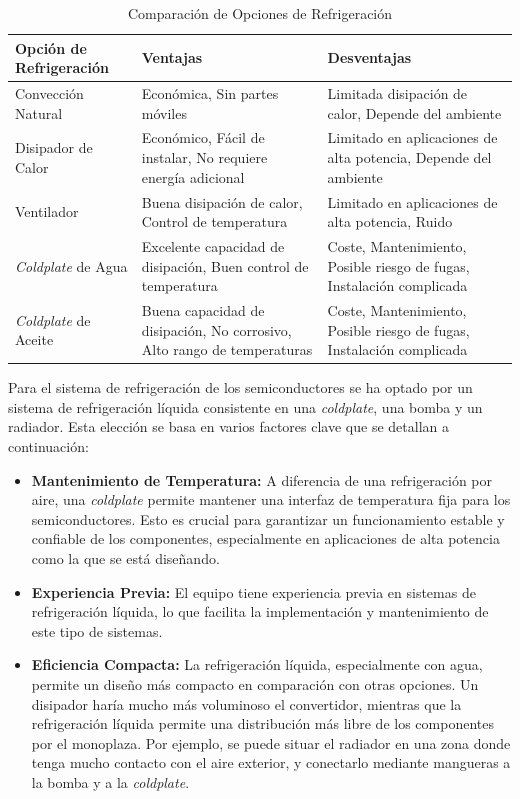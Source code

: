 \begin{table}[H]
	\centering
	\begin{tabular}{|p{2.5cm}|p{5cm}|p{5cm}|}
		\hline
		\textbf{Opción de Refrigeración} & \textbf{Ventajas} & \textbf{Desventajas} \\ \hline
		Convección Natural & Económica, Sin partes móviles & Limitada disipación de calor, Depende del ambiente \\ \hline
		Disipador de Calor & Económico, Fácil de instalar, No requiere energía adicional & Limitado en aplicaciones de alta potencia, Depende del ambiente \\ \hline
		Ventilador & Buena disipación de calor, Control de temperatura & Limitado en aplicaciones de alta potencia, Ruido \\ \hline
		\textit{Coldplate} de Agua & Excelente capacidad de disipación, Buen control de temperatura & Coste, Mantenimiento, Posible riesgo de fugas, Instalación complicada \\ \hline
		\textit{Coldplate} de Aceite & Buena capacidad de disipación, No corrosivo, Alto rango de temperaturas &  Coste, Mantenimiento, Posible riesgo de fugas, Instalación complicada \\ \hline
	\end{tabular}
	\caption{Comparación de Opciones de Refrigeración}
\end{table}



Para el sistema de refrigeración de los semiconductores se ha optado por un sistema de refrigeración líquida consistente en una \textit{coldplate}, una bomba y un radiador. Esta elección se basa en varios factores clave que se detallan a continuación:

\begin{itemize}
	\item \textbf{Mantenimiento de Temperatura:} A diferencia de una refrigeración por aire, una \textit{coldplate} permite mantener una interfaz de temperatura fija para los semiconductores. Esto es crucial para garantizar un funcionamiento estable y confiable de los componentes, especialmente en aplicaciones de alta potencia como la que se está diseñando.
	
	\item \textbf{Experiencia Previa:} El equipo tiene experiencia previa en sistemas de refrigeración líquida, lo que facilita la implementación y mantenimiento de este tipo de sistemas.
	
	\item \textbf{Eficiencia Compacta:} La refrigeración líquida, especialmente con agua, permite un diseño más compacto en comparación con otras opciones. Un disipador haría mucho más voluminoso el convertidor, mientras que la refrigeración líquida permite una distribución más libre de los componentes por el monoplaza. Por ejemplo, se puede situar el radiador en una zona donde tenga mucho contacto con el aire exterior, y conectarlo mediante mangueras a la bomba y a la \textit{coldplate}.
	
	
\end{itemize}

